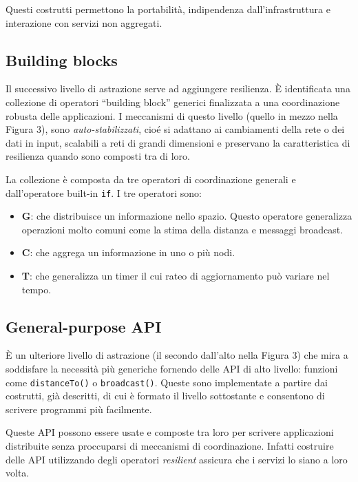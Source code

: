 Questi costrutti permettono la portabilità, indipendenza dall'infrastruttura e
interazione con servizi non aggregati.

\subsection{Building blocks}
Il successivo livello di astrazione serve ad aggiungere resilienza. È
identificata una collezione di operatori ``building block'' generici finalizzata
a una coordinazione robusta delle applicazioni. I meccanismi di questo livello
(quello in mezzo nella Figura 3), sono \textit{auto-stabilizzati}, cioé si
adattano ai cambiamenti della rete o dei dati in input, scalabili a reti di
grandi dimensioni e preservano la caratteristica di resilienza quando sono
composti tra di loro\cite{7056345}.

La collezione è composta da tre operatori di coordinazione generali e
dall'operatore built-in \texttt{if}. I tre operatori sono:
\begin{itemize}
\item \textbf{G}: che distribuisce un informazione nello spazio. Questo
  operatore generalizza operazioni molto comuni come la stima della distanza e
  messaggi broadcast.
\item \textbf{C}: che aggrega un informazione in uno o più nodi.
\item \textbf{T}: che generalizza un timer il cui rateo di aggiornamento può
  variare nel tempo.
\end{itemize}

\subsection{General-purpose API}
È un ulteriore livello di astrazione (il secondo dall'alto nella Figura 3) che
mira a soddisfare la necessità più generiche fornendo delle API di alto livello:
funzioni come \texttt{distanceTo()} o \texttt{broadcast()}. Queste sono
implementate a partire dai costrutti, già descritti, di cui è formato il livello
sottostante e consentono di scrivere programmi più facilmente.

Queste API possono essere usate e composte tra loro per scrivere applicazioni
distribuite senza proccuparsi di meccanismi di coordinazione. Infatti costruire
delle API utilizzando degli operatori \textit{resilient} assicura che i servizi
lo siano a loro volta.


